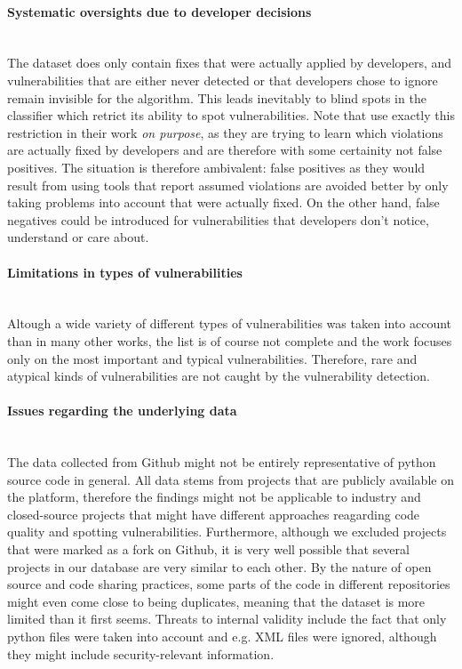 \documentclass[
	a4paper,
	pagesize,
	pdftex,
	12pt,
	twoside, %
	BCOR=5mm, %
	ngerman,
	fleqn,
	final,
	]{scrartcl}
\begin{document}
\paragraph{Systematic oversights due to developer decisions}\mbox{}\\
The dataset does only contain fixes that were actually applied by developers, and vulnerabilities that are either never detected or that developers chose to ignore remain invisible for the algorithm. This leads inevitably to blind spots in the classifier which retrict its ability to spot vulnerabilities. Note that \cite{Liu.2018} use exactly this restriction in their work \textit{on purpose}, as they are trying to learn which violations are actually fixed by developers and are therefore with some certainity not false positives. The situation is therefore ambivalent: false positives as they would result from using tools that report assumed violations are avoided better by only taking problems into account that were actually fixed. On the other hand, false negatives could be introduced for vulnerabilities that developers don't notice, understand or care about.
\paragraph{Limitations in types of vulnerabilities}\mbox{}\\
Altough a wide variety of different types of vulnerabilities was taken into account than in many other works, the list is of course not complete and the work focuses only on the most important and typical vulnerabilities. Therefore, rare and atypical kinds of vulnerabilities are not caught by the vulnerability detection.
\paragraph{Issues regarding the underlying data}\mbox{}\\
The data collected from Github might not be entirely representative of python source code in general. All data stems from projects that are publicly available on the platform, therefore the findings might not be applicable to industry and closed-source projects that might have different approaches reagarding code quality and spotting vulnerabilities. Furthermore, although we excluded projects that were marked as a fork on Github, it is very well possible that several projects in our database are very similar to each other. By the nature of open source and code sharing practices, some parts of the code in different repositories might even come close to being duplicates, meaning that the dataset is more limited than it first seems. Threats to internal validity include the fact that only python files were taken into account and e.g. XML files were ignored, although they might include security-relevant information. 
\end{document}
